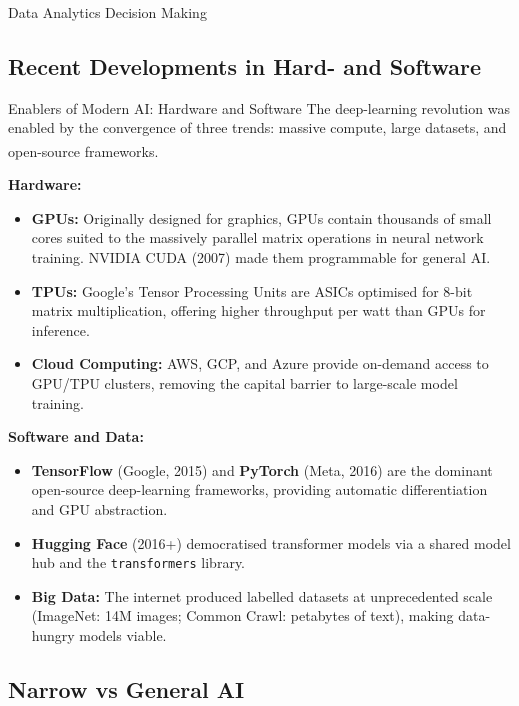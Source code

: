 \begin{v3topic}{Data Analytics Decision Making}
    \subsection{Recent Developments in Hard- and Software}

\begin{v3topic}{Enablers of Modern AI: Hardware and Software}
        The deep-learning revolution was enabled by the convergence of three trends: massive compute, large datasets, and open-source frameworks.\textsuperscript{\cite{adjaouteAI2024}}

        \textbf{Hardware:}
        \begin{itemize}
            \item \textbf{GPUs:} Originally designed for graphics, GPUs contain thousands of small cores suited to the massively parallel matrix operations in neural network training. NVIDIA CUDA (2007) made them programmable for general AI.
            \item \textbf{TPUs:} Google's Tensor Processing Units are ASICs optimised for 8-bit matrix multiplication, offering higher throughput per watt than GPUs for inference.
            \item \textbf{Cloud Computing:} AWS, GCP, and Azure provide on-demand access to GPU/TPU clusters, removing the capital barrier to large-scale model training.
        \end{itemize}

        \textbf{Software and Data:}
        \begin{itemize}
            \item \textbf{TensorFlow} (Google, 2015) and \textbf{PyTorch} (Meta, 2016) are the dominant open-source deep-learning frameworks, providing automatic differentiation and GPU abstraction.
            \item \textbf{Hugging Face} (2016+) democratised transformer models via a shared model hub and the \texttt{transformers} library.
            \item \textbf{Big Data:} The internet produced labelled datasets at unprecedented scale (ImageNet: 14M images; Common Crawl: petabytes of text), making data-hungry models viable.
        \end{itemize}
\end{v3topic}

    \subsection{Narrow vs General AI}


\end{v3topic}
